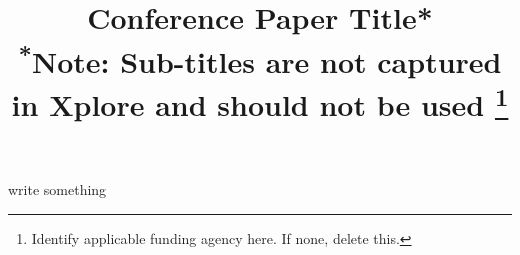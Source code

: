 \documentclass[11pt,conference]{IEEEtran}
\begin{document}
\title{Conference Paper Title*\\
{\footnotesize \textsuperscript{*}Note: Sub-titles are not captured in Xplore and
should not be used}
\thanks{Identify applicable funding agency here. If none, delete this.}
}

\author{
\and
{}
\and
{}
}

\maketitle

write something








\newpage
\appendix

\end{document}
